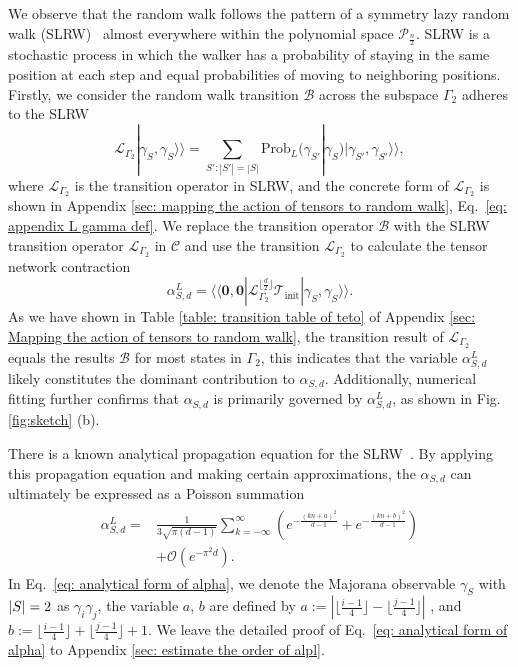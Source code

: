 \documentclass[showpacs,twocolumn,aps,prx,long bibliography,superscriptaddress,notitlepage]{revtex4-1}
\newcommand{\supket}[1]{|#1 \rangle\rangle}
\newcommand{\supbra}[1]{\langle\langle #1 |}
\newcommand{\Tcal}{\mathcal{T}}
\begin{document}
We observe that the random walk follows the pattern of a symmetry lazy random walk (SLRW)~\cite{giuggioli2020exact, lawler2010random} almost everywhere within the {polynomial space $\mathcal{P}_{\frac{n}{2}}$.}
SLRW is a stochastic process in which the walker has a probability of staying in the same position at each step and equal probabilities of moving to neighboring positions. 
Firstly, we consider the random walk transition $\mathcal{B}$ across the subspace $\Gamma_2$ adheres to the SLRW
\begin{equation}
    \mathcal{L}_{\Gamma_2}\supket{\gamma_S, \gamma_S} = \sum_{S':|S'| = |S|} \mathrm{Prob}_L(\gamma_{S'}|\gamma_S) \supket{\gamma_{S'}, \gamma_{S'}},
\end{equation}
where $\mathcal{L}_{\Gamma_2}$ is the transition operator in SLRW, and the concrete form of $\mathcal{L}_{\Gamma_2}$ is shown in Appendix \ref{sec: mapping the action of tensors to random walk}, Eq.~\eqref{eq: appendix L gamma def}. We replace the transition operator $\mathcal{B}$ with the SLRW transition operator $\mathcal{L}_{\Gamma_2}$ in $\mathcal{C}$ and use the transition $\mathcal{L}_{\Gamma_2}$ to calculate the tensor network contraction
\begin{equation}
    \alpha_{S,d}^L = \supbra{\bm 0,\bm 0} \mathcal{L}_{\Gamma_2}^{\lfloor \frac{d}{2}\rfloor} \Tcal_\text{init} \supket{\gamma_S, \gamma_S}.
    \label{eq: alphal Twhole}
\end{equation}
As we have shown in Table \ref{table: transition table of teto} of Appendix \ref{sec: Mapping the action of tensors to random walk}, the transition result of $\mathcal{L}_{\Gamma_2}$ equals the results $\mathcal{B}$ for most states in $\Gamma_2$, this indicates that the variable $\alpha_{S,d}^L$ likely constitutes the dominant contribution to $\alpha_{S,d}$. Additionally, numerical fitting further confirms that $\alpha_{S,d}$ is primarily governed by $\alpha_{S,d}^L$, as shown in Fig. \ref{fig:sketch} (b).


There is a known analytical propagation equation for the SLRW~\cite{giuggioli2020exact}. By applying this propagation equation and making certain approximations, the $ \alpha_{S,d} $ can ultimately be expressed as a Poisson summation
\begin{align}
\begin{aligned}
    \alpha_{S,d}^L =& \frac{1}{3\sqrt{\pi (d-1)}} \sum_{k = -\infty}^\infty \left(e^{-\frac{(kn+a)^2}{d-1}} + e^{-\frac{(kn+b)^2}{d-1}}  \right) \\
    &+ \mathcal{O}(e^{-\pi^2 d}).
\end{aligned}
    \label{eq: analytical form of alpha}
\end{align}
In Eq.~\eqref{eq: analytical form of alpha}, we denote the Majorana observable $\gamma_S$ with $\abs{S} = 2$
as $\gamma_i \gamma_j$, the variable $a$, $b$ are defined by $a:= |\lfloor\frac{i-1}{4}\rfloor-\lfloor\frac{j-1}{4}\rfloor|$ , and $b := \lfloor\frac{i-1}{4}\rfloor+\lfloor\frac{j-1}{4}\rfloor+1$. We leave the detailed proof of Eq.~\eqref{eq: analytical form of alpha} 
to Appendix \ref{sec: estimate the order of alpl}. 
\end{document}
